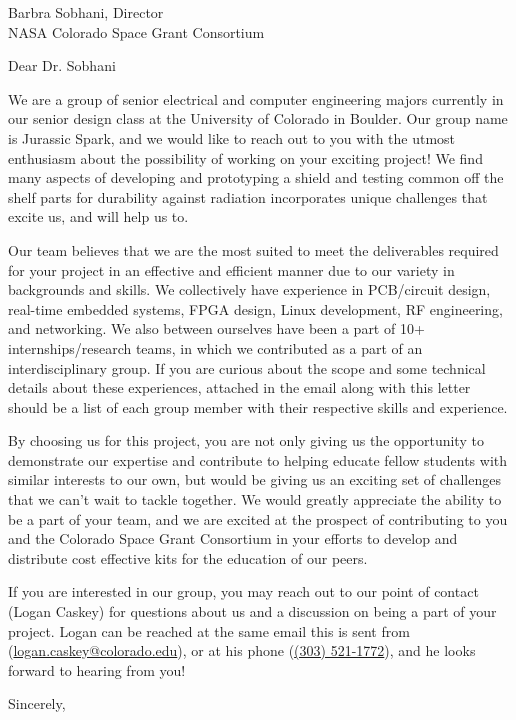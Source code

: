 \documentclass{letter}
\begin{document}
\begin{letter}
{Barbra Sobhani, Director\\
NASA Colorado Space Grant Consortium
}

\opening{Dear Dr. Sobhani}

We are a group of senior electrical and computer engineering majors currently in our senior design class at the University of Colorado in Boulder. Our group name is Jurassic Spark, and we would like to reach out to you with the utmost enthusiasm about the possibility of working on your exciting project! We find many aspects of developing and prototyping a shield and testing common off the shelf parts for durability against radiation incorporates unique challenges that excite us, and will help us to.

Our team believes that we are the most suited to meet the deliverables required for your project in an effective and efficient manner due to our variety in backgrounds and skills. We collectively have experience in PCB/circuit design, real-time embedded systems, FPGA design, Linux development, RF engineering, and networking. We also between ourselves have been a part of 10+ internships/research teams, in which we contributed as a part of an interdisciplinary group. If you are curious about the scope and some technical details about these experiences, attached in the email along with this letter should be a list of each group member with their respective skills and experience. 

By choosing us for this project, you are not only giving us the opportunity to demonstrate our expertise and contribute to helping educate fellow students with similar interests to our own, but would be giving us an exciting set of challenges that we can't wait to tackle together. We would greatly appreciate the ability to be a part of your team, and we are excited at the prospect of contributing to you and the Colorado Space Grant Consortium in your efforts to develop and distribute cost effective kits for the education of our peers. 

If you are interested in our group, you may reach out to our point of contact (Logan Caskey) for questions about us and a discussion on being a part of your project. Logan can be reached at the same email this is sent from (\href{mailto:logan.caskey@colorado.edu}{logan.caskey@colorado.edu}), or at his phone (\href{tel:+13035211772}{(303) 521-1772}), and he looks forward to hearing from you! 

\vspace{1em}

\closing{Sincerely,}

\end{letter}
\end{document}
